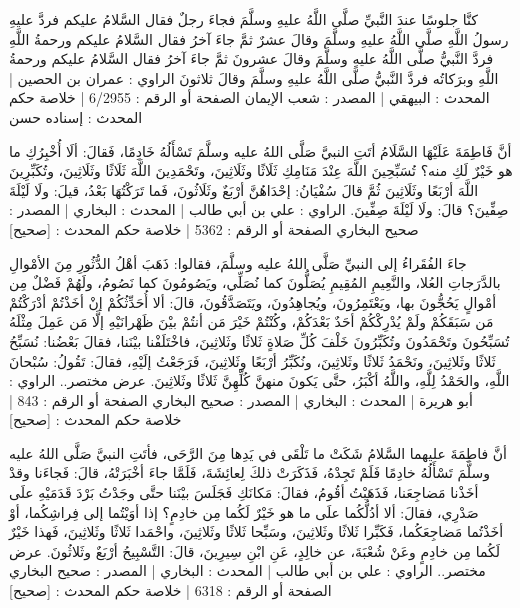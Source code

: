 كنَّا جلوسًا عندَ النَّبيِّ صلَّى اللَّهُ عليهِ وسلَّمَ فجاءَ رجلٌ فقال السَّلامُ عليكم فردَّ عليهِ رسولُ اللَّهِ صلَّى اللَّهُ عليهِ وسلَّمَ وقالَ عشرٌ ثمَّ جاءَ آخرُ فقال السَّلامُ عليكم ورحمةُ اللَّهِ فردَّ النَّبيُّ صلَّى اللَّهُ عليهِ وسلَّمَ وقالَ عشرونَ ثمَّ جاءَ آخرُ فقال السَّلامُ عليكم ورحمةُ اللَّهِ وبرَكاتُه فردَّ النَّبيُّ صلَّى اللَّهُ عليهِ وسلَّمَ وقالَ ثلاثونَ
الراوي : عمران بن الحصين | المحدث : البيهقي | المصدر : شعب الإيمان
الصفحة أو الرقم : 6/2955 | خلاصة حكم المحدث : إسناده حسن

أنَّ فَاطِمَةَ عَلَيْهَا السَّلَامُ أتَتِ النبيَّ صَلَّى اللهُ عليه وسلَّمَ تَسْأَلُهُ خَادِمًا، فَقالَ: ألَا أُخْبِرُكِ ما هو خَيْرٌ لَكِ منه؟ تُسَبِّحِينَ اللَّهَ عِنْدَ مَنَامِكِ ثَلَاثًا وثَلَاثِينَ، وتَحْمَدِينَ اللَّهَ ثَلَاثًا وثَلَاثِينَ، وتُكَبِّرِينَ اللَّهَ أرْبَعًا وثَلَاثِينَ ثُمَّ قالَ سُفْيَانُ: إحْدَاهُنَّ أرْبَعٌ وثَلَاثُونَ، فَما تَرَكْتُهَا بَعْدُ، قيلَ: ولَا لَيْلَةَ صِفِّينَ؟ قالَ: ولَا لَيْلَةَ صِفِّينَ.
الراوي : علي بن أبي طالب | المحدث : البخاري | المصدر : صحيح البخاري
الصفحة أو الرقم : 5362 | خلاصة حكم المحدث : [صحيح] 

جاءَ الفُقَراءُ إلى النبيِّ صَلَّى اللهُ عليه وسلَّمَ، فقالوا: ذَهَبَ أهْلُ الدُّثُورِ مِنَ الأمْوالِ بالدَّرَجاتِ العُلا، والنَّعِيمِ المُقِيمِ يُصَلُّونَ كما نُصَلِّي، ويَصُومُونَ كما نَصُومُ، ولَهُمْ فَضْلٌ مِن أمْوالٍ يَحُجُّونَ بها، ويَعْتَمِرُونَ، ويُجاهِدُونَ، ويَتَصَدَّقُونَ، قالَ: ألا أُحَدِّثُكُمْ إنْ أخَذْتُمْ أدْرَكْتُمْ مَن سَبَقَكُمْ ولَمْ يُدْرِكْكُمْ أحَدٌ بَعْدَكُمْ، وكُنْتُمْ خَيْرَ مَن أنتُمْ بيْنَ ظَهْرانَيْهِ إلَّا مَن عَمِلَ مِثْلَهُ تُسَبِّحُونَ وتَحْمَدُونَ وتُكَبِّرُونَ خَلْفَ كُلِّ صَلاةٍ ثَلاثًا وثَلاثِينَ، فاخْتَلَفْنا بيْنَنا، فقالَ بَعْضُنا: نُسَبِّحُ ثَلاثًا وثَلاثِينَ، ونَحْمَدُ ثَلاثًا وثَلاثِينَ، ونُكَبِّرُ أرْبَعًا وثَلاثِينَ، فَرَجَعْتُ إلَيْهِ، فقالَ: تَقُولُ: سُبْحانَ اللَّهِ، والحَمْدُ لِلَّهِ، واللَّهُ أكْبَرُ، حتَّى يَكونَ منهنَّ كُلِّهِنَّ ثَلاثًا وثَلاثِينَ.
عرض مختصر..
الراوي : أبو هريرة | المحدث : البخاري | المصدر : صحيح البخاري
الصفحة أو الرقم : 843 | خلاصة حكم المحدث : [صحيح] 

أنَّ فاطِمَةَ عليهما السَّلامُ شَكَتْ ما تَلْقَى في يَدِها مِنَ الرَّحَى، فأتَتِ النبيَّ صَلَّى اللهُ عليه وسلَّمَ تَسْأَلُهُ خادِمًا فَلَمْ تَجِدْهُ، فَذَكَرَتْ ذلكَ لِعائِشَةَ، فَلَمَّا جاءَ أخْبَرَتْهُ، قالَ: فَجاءَنا وقدْ أخَذْنا مَضاجِعَنا، فَذَهَبْتُ أقُومُ، فقالَ: مَكانَكِ فَجَلَسَ بيْنَنا حتَّى وجَدْتُ بَرْدَ قَدَمَيْهِ علَى صَدْرِي، فقالَ: ألا أدُلُّكُما علَى ما هو خَيْرٌ لَكُما مِن خادِمٍ؟ إذا أوَيْتُما إلى فِراشِكُما، أوْ أخَذْتُما مَضاجِعَكُما، فَكَبِّرا ثَلاثًا وثَلاثِينَ، وسَبِّحا ثَلاثًا وثَلاثِينَ، واحْمَدا ثَلاثًا وثَلاثِينَ، فَهذا خَيْرٌ لَكُما مِن خادِمٍ وعَنْ شُعْبَةَ، عن خالِدٍ، عَنِ ابْنِ سِيرِينَ، قالَ: التَّسْبِيحُ أرْبَعٌ وثَلاثُونَ.
عرض مختصر..
الراوي : علي بن أبي طالب | المحدث : البخاري | المصدر : صحيح البخاري
الصفحة أو الرقم : 6318 | خلاصة حكم المحدث : [صحيح] 

